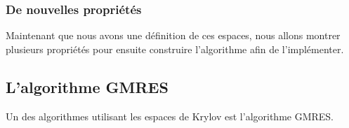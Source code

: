 \subsubsection{De nouvelles propriétés}
Maintenant que nous avons une définition de ces espaces, nous allons montrer plusieurs propriétés pour ensuite construire l'algorithme afin de l'implémenter. 
\subsection{L'algorithme GMRES}
Un des algorithmes utilisant les espaces de Krylov est l'algorithme GMRES.